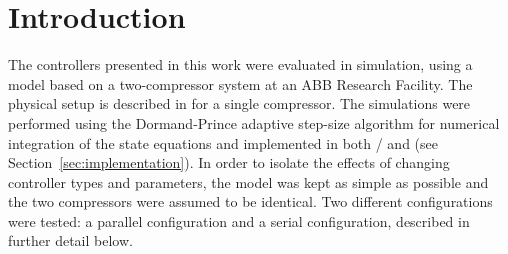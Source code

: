 \section{Introduction}

The controllers presented in this work were evaluated in simulation, using a model based on a two-compressor system at an ABB Research Facility. 
The physical setup is described in \cite{Cortinovis2015} for a single compressor.
The simulations were performed using the Dormand-Prince adaptive step-size algorithm for numerical integration of the state equations and implemented in both \mlab{}/\slink{} and \cpp{} (see Section~\ref{sec:implementation}).
In order to isolate the effects of changing controller types and parameters, the model was kept as simple as possible and the two compressors were assumed to be identical.
Two different configurations were tested: a parallel configuration and a serial configuration, described in further detail below.



